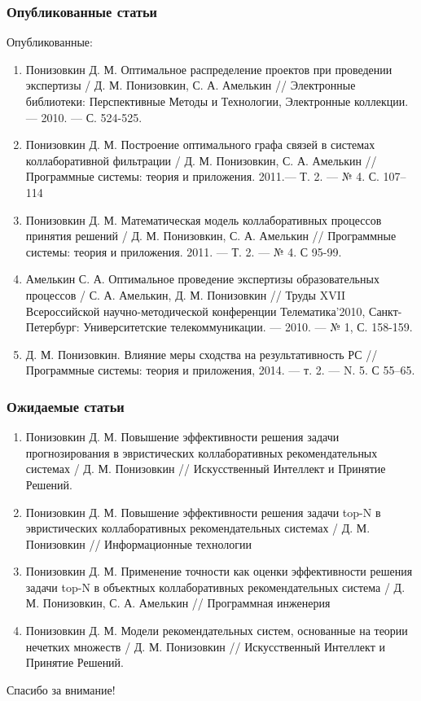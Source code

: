 \documentclass[10pt,xcolor={usenames,dvipsnames}]{beamer}
\theoremstyle{break}
\begin{document}
\begin{frame}
  \frametitle{Опубликованные статьи}
  \scriptsize{
Опубликованные:
\begin{enumerate}
\item Понизовкин Д. М. Оптимальное распределение проектов при проведении экспертизы / Д. М. Понизовкин, С. А. Амелькин // 
Электронные библиотеки: Перспективные Методы и Технологии, Электронные коллекции. --- 2010. --- С. 524-525.
\item Понизовкин Д. М. Построение оптимального графа связей в системах коллаборативной фильтрации / Д. М. Понизовкин, С. А. Амелькин // 
Программные системы: теория и приложения. 2011.--- Т. 2. --- № 4. С. 107–114
\item Понизовкин Д. М. Математическая модель коллаборативных процессов принятия решений / Д. М. Понизовкин, С. А. Амелькин // 
Программные системы: теория и приложения. 2011. --- Т. 2. --- № 4. С 95-99.
\item Амелькин С. А. Оптимальное проведение экспертизы образовательных процессов / С. А. Амелькин, Д. М. Понизовкин // 
Труды XVII Всероссийской научно-методической конференции Телематика’2010, Санкт-Петербург: Университетские телекоммуникации. --- 2010. ---
№ 1, С. 158-159.
\item Д. М. Понизовкин. Влияние меры сходства на результативность РС // Программные системы: теория и приложения, 2014. --- т. 2. --- N. 5. С 55–65.
\end{enumerate}
}
\end{frame}

\begin{frame}
  \frametitle{Ожидаемые статьи}
  \scriptsize{
    \begin{enumerate}
    \item Понизовкин Д. М. Повышение эффективности решения задачи прогнозирования в эвристических коллаборативных рекомендательных системах / Д. М. Понизовкин // 
      Искусственный Интеллект и Принятие Решений.
    \item Понизовкин Д. М. Повышение эффективности решения задачи top-N в эвристических коллаборативных рекомендательных системах / Д. М. Понизовкин // 
      Информационные технологии
    \item Понизовкин Д. М. Применение точности как оценки эффективности решения задачи top-N в объектных коллаборативных рекомендательных система / 
      Д. М. Понизовкин, С. А. Амелькин // Программная инженерия
    \item Понизовкин Д. М. Модели рекомендательных систем, основанные на теории нечетких множеств / Д. М. Понизовкин // Искусственный Интеллект и Принятие Решений.
    \end{enumerate}
  }
\end{frame}

\begin{frame}
  \begin{block}{}
    \begin{center}
      {\LARGE Спасибо за внимание!}
      \end{center}
  \end{block}
\end{frame}

\end{document}

